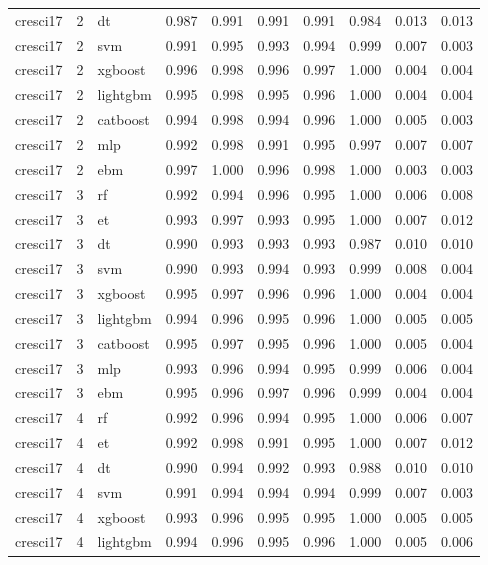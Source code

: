 \begin{tabular}{lrlrrrrrrr}
cresci17 & 2 & dt & 0.987 & 0.991 & 0.991 & 0.991 & 0.984 & 0.013 & 0.013 \\
cresci17 & 2 & svm & 0.991 & 0.995 & 0.993 & 0.994 & 0.999 & 0.007 & 0.003 \\
cresci17 & 2 & xgboost & 0.996 & 0.998 & 0.996 & 0.997 & 1.000 & 0.004 & 0.004 \\
cresci17 & 2 & lightgbm & 0.995 & 0.998 & 0.995 & 0.996 & 1.000 & 0.004 & 0.004 \\
cresci17 & 2 & catboost & 0.994 & 0.998 & 0.994 & 0.996 & 1.000 & 0.005 & 0.003 \\
cresci17 & 2 & mlp & 0.992 & 0.998 & 0.991 & 0.995 & 0.997 & 0.007 & 0.007 \\
cresci17 & 2 & ebm & 0.997 & 1.000 & 0.996 & 0.998 & 1.000 & 0.003 & 0.003 \\
cresci17 & 3 & rf & 0.992 & 0.994 & 0.996 & 0.995 & 1.000 & 0.006 & 0.008 \\
cresci17 & 3 & et & 0.993 & 0.997 & 0.993 & 0.995 & 1.000 & 0.007 & 0.012 \\
cresci17 & 3 & dt & 0.990 & 0.993 & 0.993 & 0.993 & 0.987 & 0.010 & 0.010 \\
cresci17 & 3 & svm & 0.990 & 0.993 & 0.994 & 0.993 & 0.999 & 0.008 & 0.004 \\
cresci17 & 3 & xgboost & 0.995 & 0.997 & 0.996 & 0.996 & 1.000 & 0.004 & 0.004 \\
cresci17 & 3 & lightgbm & 0.994 & 0.996 & 0.995 & 0.996 & 1.000 & 0.005 & 0.005 \\
cresci17 & 3 & catboost & 0.995 & 0.997 & 0.995 & 0.996 & 1.000 & 0.005 & 0.004 \\
cresci17 & 3 & mlp & 0.993 & 0.996 & 0.994 & 0.995 & 0.999 & 0.006 & 0.004 \\
cresci17 & 3 & ebm & 0.995 & 0.996 & 0.997 & 0.996 & 0.999 & 0.004 & 0.004 \\
cresci17 & 4 & rf & 0.992 & 0.996 & 0.994 & 0.995 & 1.000 & 0.006 & 0.007 \\
cresci17 & 4 & et & 0.992 & 0.998 & 0.991 & 0.995 & 1.000 & 0.007 & 0.012 \\
cresci17 & 4 & dt & 0.990 & 0.994 & 0.992 & 0.993 & 0.988 & 0.010 & 0.010 \\
cresci17 & 4 & svm & 0.991 & 0.994 & 0.994 & 0.994 & 0.999 & 0.007 & 0.003 \\
cresci17 & 4 & xgboost & 0.993 & 0.996 & 0.995 & 0.995 & 1.000 & 0.005 & 0.005 \\
cresci17 & 4 & lightgbm & 0.994 & 0.996 & 0.995 & 0.996 & 1.000 & 0.005 & 0.006 \\

\end{tabular}
